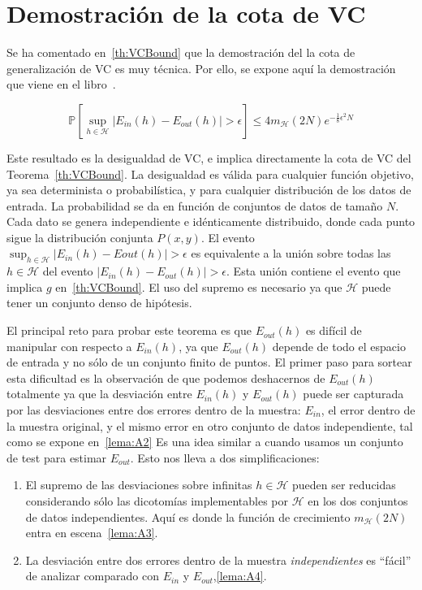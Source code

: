 \appendix
\chapter{Demostración de la cota de VC}
\label{apendice:demVC}
Se ha comentado en~\ref{th:VCBound} que la demostración del la cota de
generalización de VC es muy técnica. Por ello, se expone aquí la demostración
que viene en el libro~\cite{Abu-Mostafa:2012:LD:2207825}.

\begin{teorema}
\label{th:A1}
   \begin{displaymath}
       \mathbb{P} \left [\sup_{h \in \mathcal{H}} | E_{in}(h) - E_{out}(h) | > \epsilon \right] \leq 4m_{\mathcal{H}}(2N)e^{-\frac{1}{8} \epsilon^2 N}
   \end{displaymath}
\end{teorema}

Este resultado es la desigualdad de VC, e implica directamente la cota de VC
del Teorema~\ref{th:VCBound}. La desigualdad es válida para cualquier función
objetivo, ya sea determinista o probabilística, y para cualquier distribución
de los datos de entrada. La probabilidad se da en función de conjuntos de datos
de tamaño $N$. Cada dato se genera independiente e idénticamente distribuido,
donde cada punto sigue la distribución conjunta $P(x,y)$. El evento
$\sup_{h \in \mathcal{H}} | E_{in}(h) - E{out}(h) | > \epsilon$ es equivalente
a la unión sobre todas las $h \in \mathcal{H}$ del evento
$| E_{in}(h) - E_{out}(h) | > \epsilon$. Esta unión contiene el evento que
implica $g$ en~\ref{th:VCBound}. El uso del supremo es necesario ya que
$\mathcal{H}$ puede tener un conjunto denso de hipótesis.

El principal reto para probar este teorema es que $E_{out}(h)$ es difícil de
manipular con respecto a $E_{in}(h)$, ya que $E_{out}(h)$ depende de todo el
espacio de entrada y no sólo de un conjunto finito de puntos. El primer paso
para sortear esta dificultad es la observación de que podemos deshacernos de
$E_{out}(h)$ totalmente ya que la desviación entre $E_{in}(h)$ y $E_{out}(h)$
puede ser capturada por las desviaciones entre dos errores dentro de la muestra:
$E_{in}$, el error dentro de la muestra original, y el mismo error en otro
conjunto de datos independiente, tal como se expone en~\ref{lema:A2}
Es una idea similar a cuando usamos un conjunto de test para estimar $E_{out}$.
Esto nos lleva a dos simplificaciones:

\begin{enumerate}
    \item
    El supremo de las desviaciones sobre infinitas $h \in \mathcal{H}$ pueden ser
    reducidas considerando sólo las dicotomías implementables por $\mathcal{H}$
    en los dos conjuntos de datos independientes. Aquí es donde la función
    de crecimiento $m_{\mathcal{H}}(2N)$ entra en escena~\ref{lema:A3}.
    \item
    La desviación entre dos errores dentro de la muestra \emph{independientes}
    es ``fácil'' de analizar comparado con $E_{in}$ y $E_{out}$,\ref{lema:A4}.
\end{enumerate}

